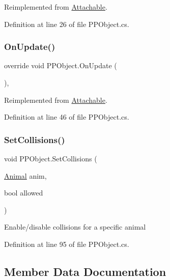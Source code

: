Reimplemented from \mbox{\hyperlink{class_attachable_a3c05c0b07b831881a7ab245057d34d30}{Attachable}}.



Definition at line 26 of file P\+P\+Object.\+cs.

\mbox{\label{class_p_p_object_a74855705698504fae01ef77b0cee6313}} 
\subsubsection{\texorpdfstring{On\+Update()}{OnUpdate()}}
{\footnotesize\ttfamily override void P\+P\+Object.\+On\+Update (\begin{DoxyParamCaption}{ }\end{DoxyParamCaption})\hspace{0.3cm}{\ttfamily [protected]}, {\ttfamily [virtual]}}



Reimplemented from \mbox{\hyperlink{class_attachable_abb659a66efacd6fa09fa1d7125c7b5e6}{Attachable}}.



Definition at line 46 of file P\+P\+Object.\+cs.

\mbox{\label{class_p_p_object_a6a35b92bb58b0e3b5e8f7857940ada54}} 
\subsubsection{\texorpdfstring{Set\+Collisions()}{SetCollisions()}}
{\footnotesize\ttfamily void P\+P\+Object.\+Set\+Collisions (\begin{DoxyParamCaption}\item[{\mbox{\hyperlink{class_animal}{Animal}}}]{anim,  }\item[{bool}]{allowed }\end{DoxyParamCaption})}



Enable/disable collisions for a specific animal 



Definition at line 95 of file P\+P\+Object.\+cs.



\subsection{Member Data Documentation}
\mbox{\label{class_p_p_object_a7df76e4799e0afc65ac5fa5bf8f5c33c}} 
